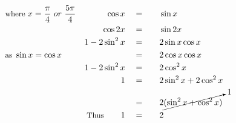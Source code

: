 \begin{alignat*}{5}
&\small\text{where }x=\frac{\pi}{4}~or~\frac{5\pi}{4}&\cos{x}\quad&=\quad&&\sin{x}\\
&\,&\cos{2x}\quad&=&&\sin{2x}\\
&\,&1-2\sin^2{x}\quad&=&&2\sin{x}\cos{x}\\
&\small\text{as }\sin{x}=\cos{x}&\,&=&&2\cos{x}\cos{x}\\
&\,&1-2\sin^2{x}\quad&=&&2\cos^2{x}\\
&\,&1\quad&=&&2\sin^2{x}+2\cos^2{x}\\
&\,&\,&=&&2\cancelto{1}{(\sin^2{x+\cos^2{x}})}\\
&\,&\small\text{Thus}\normalsize\qquad1\quad&=&&2
\end{alignat*}
